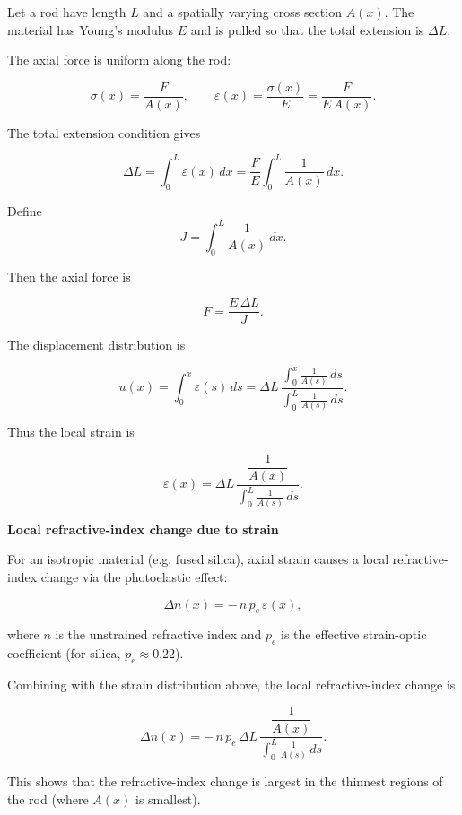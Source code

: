 \documentclass[aps,pra, onecolumn,superscriptaddress,nopacs,floatfix, showkeys, notitlepage]{revtex4-1}
\begin{document}
Let a rod have length $L$ and a spatially varying cross section $A(x)$.
The material has Young's modulus $E$ and is pulled so that the total
extension is $\Delta L$.

The axial force is uniform along the rod:

\[
\sigma(x) = \frac{F}{A(x)}, \qquad
\varepsilon(x) = \frac{\sigma(x)}{E} = \frac{F}{E\,A(x)}.
\]

The total extension condition gives

\[
\Delta L = \int_0^L \varepsilon(x)\,dx
         = \frac{F}{E} \int_0^L \frac{1}{A(x)}\,dx.
\]

Define
\[
J = \int_0^L \frac{1}{A(x)}\,dx.
\]

Then the axial force is

\[
F = \frac{E\,\Delta L}{J}.
\]

The displacement distribution is

\[
u(x)
= \int_0^x \varepsilon(s)\,ds
= \Delta L\,
  \frac{\displaystyle \int_0^x \frac{1}{A(s)}\,ds}
       {\displaystyle \int_0^L \frac{1}{A(s)}\,ds}.
\]

Thus the local strain is

\[
\boxed{
\varepsilon(x)
= \Delta L\,
  \frac{\dfrac{1}{A(x)}}
       {\displaystyle \int_0^L \frac{1}{A(s)}\,ds}
}.
\]



\textbf{Local refractive-index change due to strain}

For an isotropic material (e.g. fused silica), axial strain causes
a local refractive-index change via the photoelastic effect:

\[
\Delta n(x) = -\,n\,p_e\,\varepsilon(x),
\]

where $n$ is the unstrained refractive index and $p_e$ is the effective
strain-optic coefficient (for silica, $p_e \approx 0.22$).

Combining with the strain distribution above, the local refractive-index
change is

\[
\boxed{
\Delta n(x)
= -\,n\,p_e\,\Delta L\,
  \frac{\dfrac{1}{A(x)}}
       {\displaystyle \int_0^L \frac{1}{A(s)}\,ds}
}.
\]

This shows that the refractive-index change is largest in the thinnest
regions of the rod (where $A(x)$ is smallest).

\end{document}
